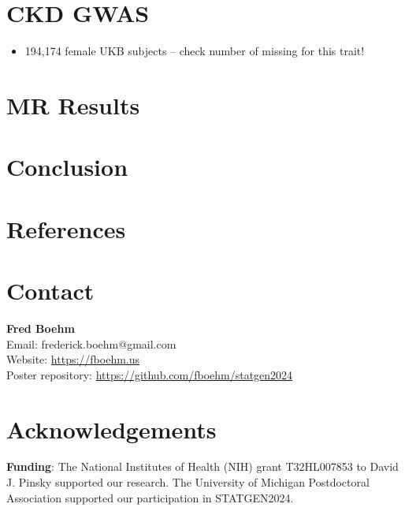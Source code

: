 \documentclass[a0paper,fleqn]{betterposter}
\begin{document}
{\section{CKD GWAS \cite{neale_lab_gwas}}
\begin{itemize}
\item 194,174 female UKB subjects -- check number of missing for this trait!
\end{itemize}


\section{MR Results}




\section{Conclusion}





\section{References}
\printbibliography[heading=none]


\section{Contact}
\textbf{Fred Boehm}\\
Email: frederick.boehm@gmail.com\\
Website: \url{https://fboehm.us}\\
Poster repository: \url{https://github.com/fboehm/statgen2024}


\section{Acknowledgements}
\textbf{Funding}: The National Institutes of Health (NIH) grant T32HL007853 to David J. Pinsky supported our research. The University of Michigan Postdoctoral Association supported our participation in STATGEN2024. 

}
\end{document}

